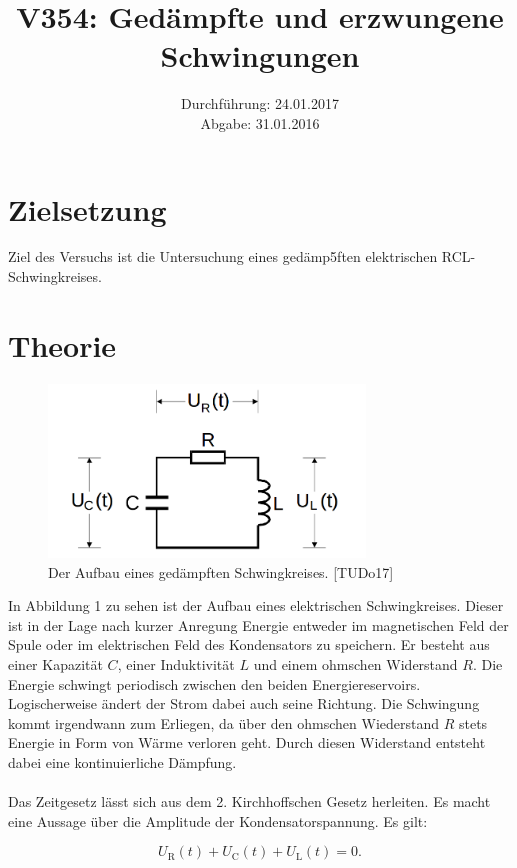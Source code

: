 \documentclass[
  bibliography=totoc,     %
  captions=tableheading,  %
  titlepage=firstiscover, %
]{scrartcl}
\title{V354: Gedämpfte und erzwungene Schwingungen}
\author{
  Simon Schulte
  \texorpdfstring{
    \\
    \href{mailto:simon.schulte@udo.edu}{simon.schulte@udo.edu}
  }{}
  \texorpdfstring{\and}{, }
  Tim Sedlaczek
  \texorpdfstring{
    \\
    \href{mailto:tim.sedlaczek@udo.edu}{tim.sedlaczek@udo.edu}
  }{}
}
\date{Durchführung: 24.01.2017\\
      Abgabe: 31.01.2016}
\begin{document}
\maketitle
\thispagestyle{empty}
\tableofcontents
\newpage
\section{Zielsetzung}
\label{zielsetzung}
Ziel des Versuchs ist die Untersuchung eines gedämp5ften elektrischen
RCL-Schwingkreises.
\section{Theorie}
\label{theorie}
\begin{figure}[htb]
  \centering
  \includegraphics[width=0.75\textwidth]{V3541.png}
  \caption{Der Aufbau eines gedämpften Schwingkreises. [TUDo17]}
\end{figure}
\label{V3541}
In Abbildung 1 zu sehen ist der Aufbau eines elektrischen
Schwingkreises. Dieser ist in der Lage nach kurzer Anregung Energie entweder
im magnetischen Feld der Spule oder im elektrischen Feld des Kondensators zu
speichern. Er besteht aus einer Kapazität $C$, einer Induktivität $L$ und einem
ohmschen Widerstand $R$. Die Energie schwingt periodisch zwischen den beiden
Energiereservoirs. Logischerweise ändert der Strom dabei auch seine Richtung.
Die Schwingung kommt irgendwann zum Erliegen, da über den ohmschen Wiederstand
$R$ stets Energie in Form von Wärme verloren geht. Durch diesen Widerstand
entsteht dabei eine kontinuierliche Dämpfung. \\
\\
Das Zeitgesetz lässt sich aus dem 2. Kirchhoffschen Gesetz herleiten.
Es macht eine Aussage über die Amplitude der Kondensatorspannung. Es gilt:

\begin{equation}
    U_{\mathup{R}}(t)+U_{\mathup{C}}(t)+U_{\mathup{L}}(t)=0.
    \label{kirchhoff}
\end{equation}
\end{document}
